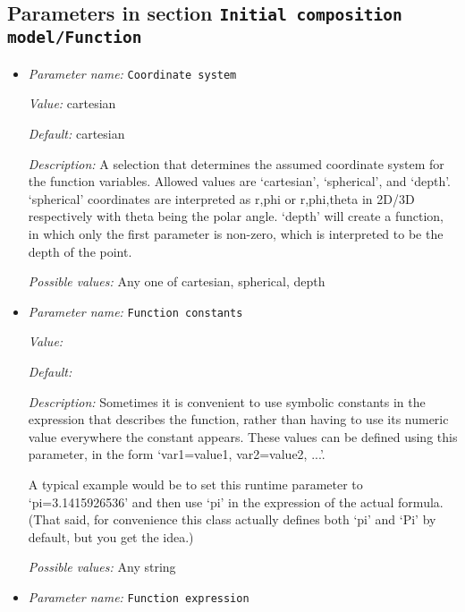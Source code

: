 \subsection{Parameters in section \tt Initial composition model/Function}
\label{parameters:Initial_20composition_20model/Function}

\begin{itemize}
\item {\it Parameter name:} {\tt Coordinate system}
\label{parameters:Initial composition model/Function/Coordinate system}


{\it Value:} cartesian


{\it Default:} cartesian


{\it Description:} A selection that determines the assumed coordinate system for the function variables. Allowed values are `cartesian', `spherical', and `depth'. `spherical' coordinates are interpreted as r,phi or r,phi,theta in 2D/3D respectively with theta being the polar angle. `depth' will create a function, in which only the first parameter is non-zero, which is interpreted to be the depth of the point.


{\it Possible values:} Any one of cartesian, spherical, depth
\item {\it Parameter name:} {\tt Function constants}
\label{parameters:Initial composition model/Function/Function constants}


{\it Value:} 


{\it Default:} 


{\it Description:} Sometimes it is convenient to use symbolic constants in the expression that describes the function, rather than having to use its numeric value everywhere the constant appears. These values can be defined using this parameter, in the form `var1=value1, var2=value2, ...'.

A typical example would be to set this runtime parameter to `pi=3.1415926536' and then use `pi' in the expression of the actual formula. (That said, for convenience this class actually defines both `pi' and `Pi' by default, but you get the idea.)


{\it Possible values:} Any string
\item {\it Parameter name:} {\tt Function expression}
\label{parameters:Initial composition model/Function/Function expression}



\end{itemize}
